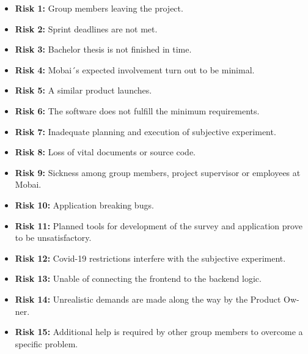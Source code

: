 \begin{itemize}
    \item \textbf{Risk 1:} Group members leaving the project.
    \item \textbf{Risk 2:} Sprint deadlines are not met.
    \item \textbf{Risk 3:} Bachelor thesis is not finished in time.
    \item \textbf{Risk 4:} Mobai´s expected involvement turn out to be minimal. 
    \item \textbf{Risk 5:} A similar product launches.
    \item \textbf{Risk 6:} The software does not fulfill the minimum requirements.
    \item \textbf{Risk 7:} Inadequate planning and execution of subjective experiment.
    \item \textbf{Risk 8:} Loss of vital documents or source code.
    \item \textbf{Risk 9:} Sickness among group members, project supervisor or employees at Mobai.
    \item \textbf{Risk 10:} Application breaking bugs.
    \item \textbf{Risk 11:} Planned tools for development of the survey and application prove to be unsatisfactory. 
    \item \textbf{Risk 12:} Covid-19 restrictions interfere with the subjective experiment. 
    \item \textbf{Risk 13:} Unable of connecting the frontend to the backend logic. 
    \item \textbf{Risk 14:} Unrealistic demands are made along the way by the Product Ow-ner. 
    \item \textbf{Risk 15:} Additional help is required by other group members to overcome a specific problem.
\end{itemize}


\newpage

